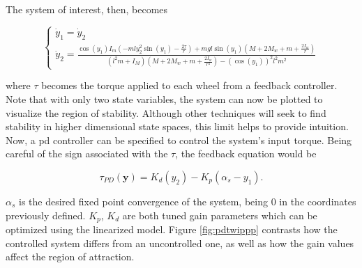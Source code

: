 The system of interest, then, becomes

\begin{equation}
\begin{cases}
     \dot{y}_{1} = \dot{y}_{2}\\
    \dot{y}_{2}=\frac{\cos \left(y_{1}\right) I_{m}\left(-m l y_{2}^{2} \sin \left(y_{1}\right)-\frac{2\tau}{r} \right)+m g l \sin \left(y_{1}\right)\left(M+2 M_{w}+m+\frac{2 I_{w}}{r}\right)}{\left(l^{2} m+I_{M}\right)\left(M+2 M_{w}+m+\frac{2 I_{w}}{r^{2}}\right)-\left(\cos \left(y_{1}\right)\right)^{2} l^{2} m^{2}}
\end{cases}
\end{equation}

where $\tau$ becomes the torque applied to each wheel from a feedback controller. Note that with only two state variables, the system can now be plotted to visualize the region of stability. Although other techniques will seek to find stability in higher dimensional state spaces, this limit helps to provide intuition.\\

Now, a \gls{pd} controller can be specified to control the system's input torque. Being careful of the sign associated with the $\tau$, the feedback equation would be

\begin{equation}
    \tau_{PD}(\bm{y}) = K_d \left( y_2 \right) - K_p \left( \alpha_s - y_1 \right) .
\end{equation}

$\alpha_s$ is the desired fixed point convergence of the system, being 0 in the coordinates previously defined. $K_p$, $K_d$ are both tuned gain parameters which can be optimized using the linearized model. Figure \ref{fig:pdtwippp} contrasts how the controlled system differs from an uncontrolled one, as well as how the gain values affect the region of attraction. 

